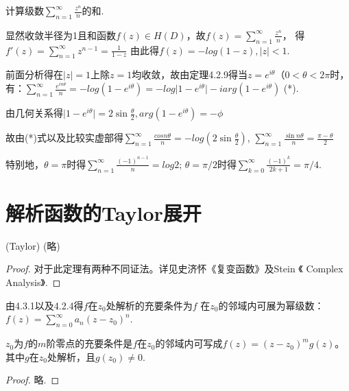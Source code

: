 \begin{eg}
	\color{blue}计算级数$\displaystyle{\sum_{n=1}^{\infty} \frac{z^n}{n}}$的和.
	
	\color{black}
	显然收敛半径为1且和函数$\displaystyle{f(z) \in H(D)}$，故$\displaystyle{f(z)=\sum_{n=1}^{\infty} \frac{z^n}{n}}$， 得$\displaystyle{f'(z)=\sum_{n=1}^{\infty} z^{n-1} = \frac{1}{1-z}}$
	由此得$\displaystyle{f(z)=-log(1-z), \vert z \vert < 1}$.
	
	前面分析得在$\displaystyle{\vert z \vert = 1}$上除$\displaystyle{z=1}$均收敛，故由定理4.2.9得当$\displaystyle{z=e^{i\theta} （0 < \theta < 2\pi}$时，有：$\displaystyle{\sum_{n=1}^{\infty} \frac{e^{in\theta}}{n} = -log(1-e^{i\theta})=-log \vert 1 - e^{i\theta} \vert - i arg(1 - e^{i\theta})}$ (*).
	
	由几何关系得$\displaystyle{\vert 1 - e ^{i\theta} \vert = 2 \sin \frac{\theta}{2}, arg(1 - e^{i\theta}) = - \phi}$ 
	
	故由(*)式以及比较实虚部得$\displaystyle{\sum_{n=1}^{\infty} \frac{cos n\theta}{n} = -log(2 \sin \frac{\theta}{2})}$, $\displaystyle{\sum_{n=1}^{\infty} \frac{\sin n\theta}{n} = \frac{\pi - \theta} {2}}$
	
	特别地，$\displaystyle{\theta = \pi}$时得$\displaystyle{\sum_{n=1}^{\infty} \frac{(-1)^{n-1}}{n} = log 2}$; $\displaystyle{\theta = \pi / 2}$时得$\displaystyle{\sum_{k=0}^{\infty} \frac{(-1)^k}{2k+1} = \pi / 4}$.
\end{eg}

\section{解析函数的{\rm Taylor}展开}
\begin{mypro}
	\color{blue}
	(\rm Taylor) \color{black} (略)
\end{mypro}

\begin{proof}
	对于此定理有两种不同证法。详见史济怀《复变函数》及Stein 《 Complex Analysis》.
\end{proof}

\begin{mypro}
	由4.3.1以及4.2.4得$\displaystyle{f}$在$\displaystyle{z_0}$处解析的充要条件为$\displaystyle{f}$ 在$\displaystyle{z_0}$的邻域内可展为幂级数：$\displaystyle{f(z)=\sum_{n=0}^{\infty}a_n (z-z_0)^n}$.
\end{mypro}

\begin{mypro}
	$\displaystyle{z_0}$为$\displaystyle{f}$的$\displaystyle{m}$阶零点的充要条件是$\displaystyle{f}$在$\displaystyle{z_0}$的邻域内可写成$\displaystyle{f(z)=(z-z_0)^m g(z)}$。其中$\displaystyle{g}$在$\displaystyle{z_0}$处解析，且$\displaystyle{g(z_0) \neq 0}$.
\end{mypro}
\begin{proof}
	略.
\end{proof}

